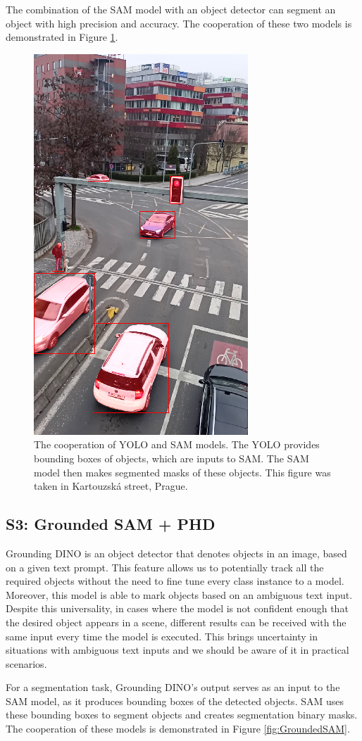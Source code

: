 The combination of the SAM model with an object detector can segment an object with high precision and accuracy.
The cooperation of these two models is demonstrated in Figure \ref{fig:yolo_sam_seg}.
\begin{figure}[h!t]
  \centering
  \includegraphics[width=0.35\linewidth]{text/chapter_04/imgs/YOLO_SAM_02}
  \caption{The cooperation of YOLO and SAM models. The YOLO provides bounding boxes of objects, which are inputs to
  SAM. The SAM model then makes segmented masks of these objects. This figure was taken in
  Kartouzská street, Prague.}
  \label{fig:yolo_sam_seg}
\end{figure}

\subsection{S3: Grounded SAM + PHD}
Grounding DINO is an object detector that denotes objects in an image, based on a given text prompt. This feature
allows us to potentially track all the required objects without the need to fine tune every class instance to a model.
Moreover, this
model is able to mark objects based on an ambiguous text input. Despite this universality,
in cases where the
model is not confident enough that the desired object appears in a scene, different results can be received with
the same input every time the model is executed. This brings uncertainty in situations with ambiguous text inputs
and we should be aware of it in practical scenarios.

For a segmentation task, Grounding DINO's output serves as an input to the SAM model, as it produces bounding boxes
of the
detected objects.
SAM uses these bounding boxes to segment objects and creates segmentation binary masks. The cooperation of these models is demonstrated in Figure \ref{fig:GroundedSAM}.

